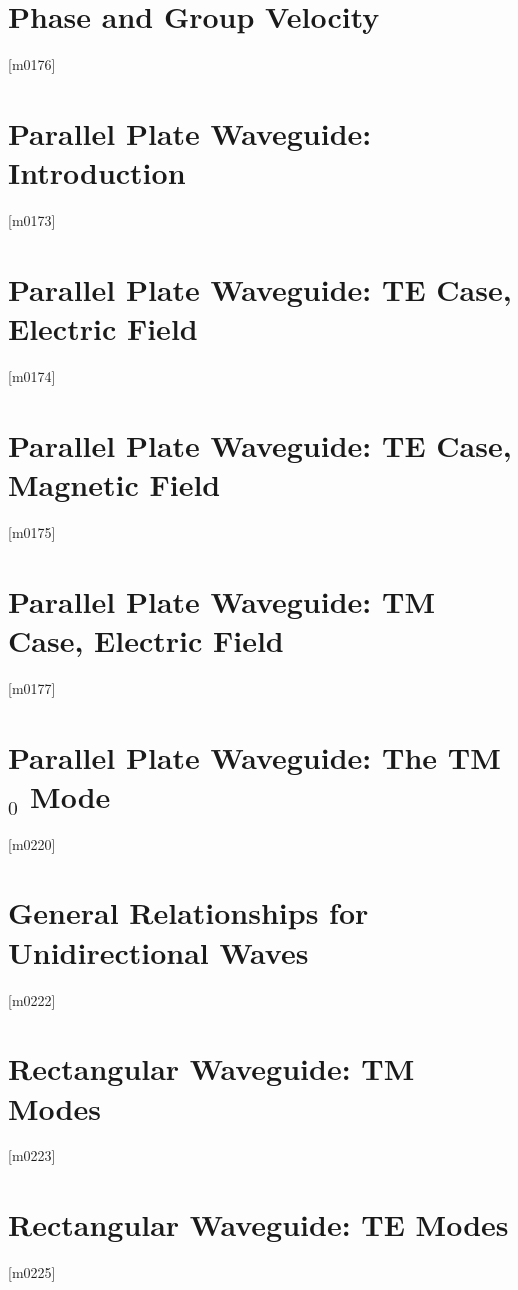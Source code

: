 \documentclass[10pt,letterpaper,twocolumn,openany]{book}
\theoremstyle{definition} %
\begin{document}
    \section{Phase and Group Velocity}
{\color{blue}\tiny[m0176]}      
      \vfill\break
    \section{Parallel Plate Waveguide: Introduction}
{\color{blue}\tiny[m0173]}      
      \vfill\break
    \section{Parallel Plate Waveguide: TE Case, Electric Field}
{\color{blue}\tiny[m0174]}      
      \vfill\break
    \section{Parallel Plate Waveguide: TE Case, Magnetic Field}
{\color{blue}\tiny[m0175]}      
      \vfill\break
    \section{Parallel Plate Waveguide: TM Case, Electric Field}
{\color{blue}\tiny[m0177]}      
      \vfill\break
    \section{Parallel Plate Waveguide: The TM$_0$ Mode}
{\color{blue}\tiny[m0220]}      
      \vfill\break
    \section{General Relationships for Unidirectional Waves}
{\color{blue}\tiny[m0222]}      
      \vfill\break
    \section{Rectangular Waveguide: TM Modes}
{\color{blue}\tiny[m0223]}      
      \vfill\break
    \section{Rectangular Waveguide: TE Modes}
{\color{blue}\tiny[m0225]}      
      \vfill\break
\end{document}
